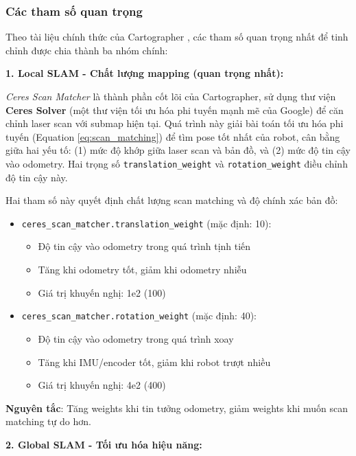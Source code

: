 \subsubsection{Các tham số quan trọng}

Theo tài liệu chính thức của Cartographer \cite{hess2016cartographer}, các tham số quan trọng nhất để tinh chỉnh được chia thành ba nhóm chính:

\textbf{1. Local SLAM - Chất lượng mapping (quan trọng nhất):}

\textit{Ceres Scan Matcher} là thành phần cốt lõi của Cartographer, sử dụng thư viện \textbf{Ceres Solver} (một thư viện tối ưu hóa phi tuyến mạnh mẽ của Google) để căn chỉnh laser scan với submap hiện tại. Quá trình này giải bài toán tối ưu hóa phi tuyến (Equation \ref{eq:scan_matching}) để tìm pose tốt nhất của robot, cân bằng giữa hai yếu tố: (1) mức độ khớp giữa laser scan và bản đồ, và (2) mức độ tin cậy vào odometry. Hai trọng số \texttt{translation\_weight} và \texttt{rotation\_weight} điều chỉnh độ tin cậy này.

Hai tham số này quyết định chất lượng scan matching và độ chính xác bản đồ:

\begin{itemize}
    \item \texttt{ceres\_scan\_matcher.translation\_weight} (mặc định: 10):
    \begin{itemize}
        \item Độ tin cậy vào odometry trong quá trình tịnh tiến
        \item Tăng khi odometry tốt, giảm khi odometry nhiễu
        \item Giá trị khuyến nghị: 1e2 (100)
    \end{itemize}

    \item \texttt{ceres\_scan\_matcher.rotation\_weight} (mặc định: 40):
    \begin{itemize}
        \item Độ tin cậy vào odometry trong quá trình xoay
        \item Tăng khi IMU/encoder tốt, giảm khi robot trượt nhiều
        \item Giá trị khuyến nghị: 4e2 (400)
    \end{itemize}
\end{itemize}

\textbf{Nguyên tắc}: Tăng weights khi tin tưởng odometry, giảm weights khi muốn scan matching tự do hơn.

\textbf{2. Global SLAM - Tối ưu hóa hiệu năng:}

